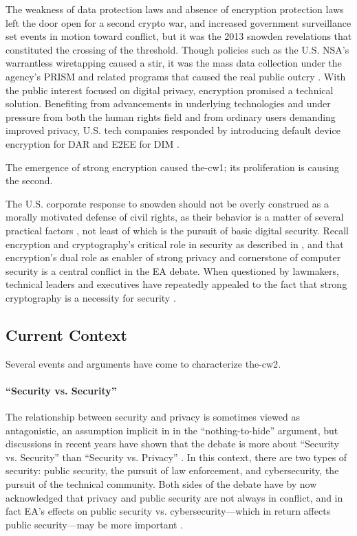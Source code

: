 The weakness of data protection laws and absence of encryption protection laws left the door open for a second crypto
war, and increased government surveillance set events in motion toward conflict, but it was the 2013 \ac{snowden}
revelations that constituted the crossing of the threshold. Though policies such as the U.S. \ac{NSA}'s warrantless
wiretapping caused a stir, it was the mass data collection under the agency's \ac{PRISM} and related programs that
caused the real public outcry \cite{landau_making_2013}. With the public interest focused on digital privacy, encryption
promised a technical solution. Benefiting from advancements in underlying technologies and under pressure from both the
human rights field and from ordinary users demanding improved privacy, U.S. tech companies responded by introducing
default device encryption for \acl{DAR} and \acl{E2EE} for \acl{DIM} \cite{treguer_us_2018}.

The emergence of strong encryption caused \ac{the-cw1}; its proliferation is causing the second.

The U.S. corporate response to \ac{snowden} should not be overly construed as a morally motivated defense of civil
rights, as their behavior is a matter of several practical factors \cite{treguer_us_2018}, not least of which is the
pursuit of basic digital security. Recall encryption and cryptography's critical role in security as described in
, and that encryption's dual role as enabler of strong privacy and cornerstone of computer
security is a central conflict in the \ac{EA} debate. When questioned by lawmakers, technical leaders and executives
have repeatedly appealed to the fact that strong cryptography is a necessity for security \cite{schulze_clipper_2017}.

\subsection{Current Context}
\label{sec-history-current}

Several events and arguments have come to characterize \ac{the-cw2}.

\paragraph*{``Security vs. Security''} The relationship between security and privacy is sometimes viewed as
antagonistic, an assumption implicit in in the ``nothing-to-hide'' argument, but discussions in recent years have shown
that the debate is more about ``Security vs. Security'' than ``Security vs. Privacy''
\cite{stalla_bourdillon_privacy_2014}. In this context, there are two types of security: public security, the pursuit of
law enforcement, and cybersecurity, the pursuit of the technical community. Both sides of the debate have by now
acknowledged that privacy and public security are not always in conflict, and in fact \ac{EA}'s effects on public
security vs. cybersecurity---which in return affects public security---may be more important \cite{schneier_2019}.

